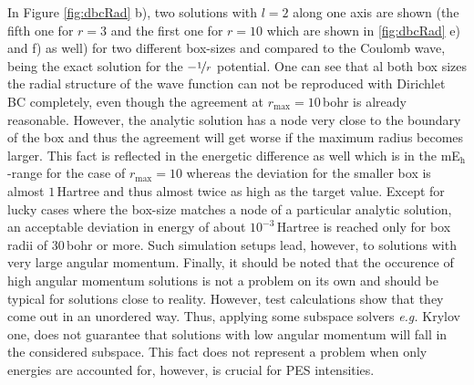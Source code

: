In Figure \ref{fig:dbcRad} b), two solutions with $l=2$ along one axis are shown (the fifth one for $r=3$ and the first one for $r=10$ which are shown in \ref{fig:dbcRad} e) and f) as well) for two different box-sizes and compared to the Coulomb wave, being the exact solution for the $-\nicefrac{1}{r}$ potential.
One can see that al both box sizes the radial structure of the wave function can not be reproduced with Dirichlet BC completely, even though the agreement at $r_\text{max}=10\,$bohr is already reasonable.
However, the analytic solution has a node very close to the boundary of the box and thus the agreement will get worse if the maximum radius becomes larger.
This fact is reflected in the energetic difference as well which is in the mE$_\text{h}$-range for the case of $r_\text{max}=10$ whereas the deviation for the smaller box is almost $1\,$Hartree and thus almost twice as high as the target value.
Except for lucky cases where the box-size matches a node of a particular analytic solution, an acceptable deviation in energy of about $10^{-3}\,$Hartree is reached only for box radii of $30\,$bohr or more.
Such simulation setups lead, however, to solutions with very large angular momentum.
Finally, it should be noted that the occurence of high angular momentum solutions is not a problem on its own and should be typical for solutions close to reality.
However, test calculations show that they come out in an unordered way.
Thus, applying some subspace solvers \textit{e.g.} Krylov one, does not guarantee that solutions with low angular momentum will fall in the considered subspace.
This fact does not represent a problem when only energies are accounted for, however, is crucial for PES intensities.


